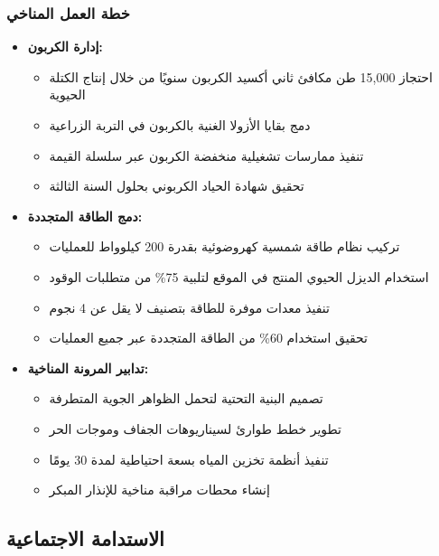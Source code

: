 \subsubsection{خطة العمل المناخي}
\begin{itemize}
    \item \textbf{إدارة الكربون:}
    \begin{itemize}
        \item احتجاز 15,000 طن مكافئ ثاني أكسيد الكربون سنويًا من خلال إنتاج الكتلة الحيوية
        \item دمج بقايا الأزولا الغنية بالكربون في التربة الزراعية
        \item تنفيذ ممارسات تشغيلية منخفضة الكربون عبر سلسلة القيمة
        \item تحقيق شهادة الحياد الكربوني بحلول السنة الثالثة
    \end{itemize}
    
    \item \textbf{دمج الطاقة المتجددة:}
    \begin{itemize}
        \item تركيب نظام طاقة شمسية كهروضوئية بقدرة 200 كيلوواط للعمليات
        \item استخدام الديزل الحيوي المنتج في الموقع لتلبية 75\% من متطلبات الوقود
        \item تنفيذ معدات موفرة للطاقة بتصنيف لا يقل عن 4 نجوم
        \item تحقيق استخدام 60\% من الطاقة المتجددة عبر جميع العمليات
    \end{itemize}
    
    \item \textbf{تدابير المرونة المناخية:}
    \begin{itemize}
        \item تصميم البنية التحتية لتحمل الظواهر الجوية المتطرفة
        \item تطوير خطط طوارئ لسيناريوهات الجفاف وموجات الحر
        \item تنفيذ أنظمة تخزين المياه بسعة احتياطية لمدة 30 يومًا
        \item إنشاء محطات مراقبة مناخية للإنذار المبكر
    \end{itemize}
\end{itemize}

\subsection{الاستدامة الاجتماعية}

